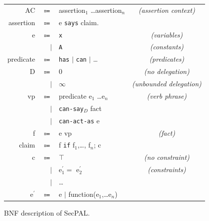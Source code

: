\documentclass[thesis.tex]{subfiles}
\begin{document}
\newcommand{\bnfcomment}[1]{\slshape{\sffamily(#1)}}
\newcommand{\secpal}[1]{\texttt{#1}}
\begin{figure}\footnotesize\centering
  \begin{tabular}{r r l c}
    AC         & $\Coloneqq$ & assertion$_1$ \dots assertion$_n$                      & \bnfcomment{assertion context} \\
    assertion  & $\Coloneqq$ & e \secpal{says} claim.                          \\
    e          & $\Coloneqq$ & \secpal{x}                                       & \bnfcomment{variables}         \\
               & $\vert$     & \secpal{A}                                       & \bnfcomment{constants}         \\
    predicate  & $\Coloneqq$ & \secpal{has} $\vert$ \secpal{can} $\vert$ \dots  & \bnfcomment{predicates}        \\
    D          & $\Coloneqq$ & 0                                                & \bnfcomment{no delegation}     \\
               & $\vert$     & $\infty$                                         & \bnfcomment{unbounded delegation}        \\
    vp         & $\Coloneqq$ & predicate e$_1$ \dots e$_n$                           & \bnfcomment{verb phrase}       \\
               & $\vert$     & \secpal{can-say}$_D$ fact                       \\
               & $\vert$     & \secpal{can-act-as}  e                          \\
    f          & $\Coloneqq$ & e vp                                             & \bnfcomment{fact}              \\
    claim      & $\Coloneqq$ & f \secpal{if} f$_1$,\dots, f$_n$; c             \\
    c          & $\Coloneqq$ & $\top$                                           & \bnfcomment{no constraint}     \\
               & $\vert$     & e$^\prime_1 =$ e$^\prime_2$                      & \bnfcomment{constraints}       \\
               & $\vert$     & \dots                                           \\
    e$^\prime$ & $\Coloneqq$ & e $\vert$ function(e$_1$,\dots e$_n$)           \\
  \end{tabular}
  \caption{BNF description of SecPAL.}
  \label{fig:secpal-grammar}
\end{figure}
\end{document}
